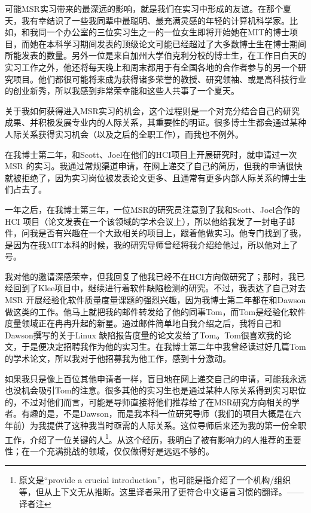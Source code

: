 \documentclass[12pt,UTF8,nofonts]{book}
\begin{document}
可能MSR实习带来的最深远的影响，就是我们在实习中形成的友谊。在那个夏天，我有幸结识了一些我同辈中最聪明、最充满灵感的年轻的计算机科学家。比如，和我同一个办公室的三位实习生之一的一位女生即将开始她在MIT的博士项目，而她在本科学习期间发表的顶级论文可能已经超过了大多数博士生在博士期间所能发表的数量。另外一位是来自加州大学伯克利分校的博士生，在工作日白天的实习工作之外，他还将每天晚上和周末都用于有全国各地的合作者参与的另一个研究项目。他们都很可能将来成为获得诸多荣誉的教授、研究领袖、或是高科技行业的创业新秀，所以我感到非常荣幸能和这些人共事了一个夏天。

\breakline

关于我如何获得进入MSR实习的机会，这个过程则是一个对充分结合自己的研究成果、并积极发展专业内的人际关系，其重要性的明证。很多博士生都会通过某种人际关系获得实习机会（以及之后的全职工作），而我也不例外。

在我博士第二年，和Scott、Joel在他们的HCI项目上开展研究时，就申请过一次MSR 的实习。我通过常规渠道申请，在网上递交了自己的简历，但我的申请很快就被拒绝了，因为实习岗位被发表论文更多、且通常有更多内部人际关系的博士生们占去了。

一年之后，在我博士第三年，一位MSR的研究员注意到了我和Scott、Joel合作的HCI 项目（论文发表在一个该领域的学术会议上），所以他给我发了一封电子邮件，问我是否有兴趣在一个大致相关的项目上，跟着他做实习。他专门找到了我，是因为在我MIT本科的时候，我的研究导师曾经将我介绍给他过，所以他对上了号。

我对他的邀请深感荣幸，但我回复了他我已经不在HCI方向做研究了；那时，我已经回到了Klee项目中，继续进行着软件缺陷检测的研究。不过，我表达了自己对去MSR 开展经验化软件质量度量课题的强烈兴趣，因为我博士第二年都在和Dawson做这类的工作。他马上就把我的邮件转发给了他的同事Tom，而Tom是经验化软件度量领域正在冉冉升起的新星。通过邮件简单地自我介绍之后，我将自己和Dawson撰写的关于Linux 缺陷报告度量的论文发给了Tom。Tom很喜欢我的论文，于是便决定招聘我作为他的实习生。在我博士第二年中我曾经读过好几篇Tom的学术论文，所以我对于他招募我为他工作，感到十分激动。

如果我只是像上百位其他申请者一样，盲目地在网上递交自己的申请，可能我永远也没机会吸引Tom的注意。很多其他的实习生也是通过某种人际关系得到实习职位的，不过对他们而言，可能是导师直接将他们推荐给了在MSR研究方向相关的学者。有趣的是，不是Dawson，而是我本科一位研究导师（我们的项目大概是在六年前）为我提供了这种我当时亟需的人际关系。这位导师后来还为我的第一份全职工作，介绍了一位关键的人\footnote{原文是``provide a crucial introduction''，也可能是指介绍了一个机构/组织等，但从上下文无从推断。这里译者采用了更符合中文语言习惯的翻译。——译者注}。从这个经历，我明白了被有影响力的人推荐的重要性；在一个充满挑战的领域，仅仅做得好是远远不够的。
\end{document}
